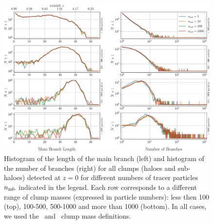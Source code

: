 



\begin{figure}
  \centering
  \includegraphics[width=\textwidth, keepaspectratio]{images/tree-statistics-my-threshold/tree_geometry-ntrace.png}%
  \caption{ Histogram of the length of the main branch (left) and
    histogram of the number of branches (right) for all clumps (haloes
    and sub-haloes) detected at $z=0$ for different numbers of tracer
    particles $n_{\rm mb}$ indicated in the legend.  Each row
    corresponds to a different range of clump masses (expressed in
    particle numbers): less then 100 (top), 100-500, 500-1000 and more
    than 1000 (bottom).  In all cases, we used the \exc\ and
    \sad\ clump mass definitions.
  }%
  \label{fig:ntracers_mbl_nbranch}
\end{figure}

